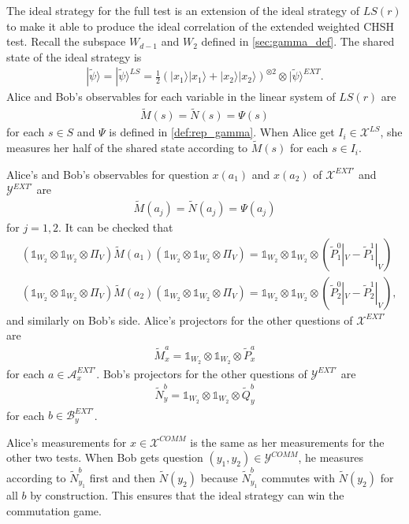 \documentclass[11pt,letterpaper]{article}
\newcommand{\ket}[1]{|#1\rangle}
\newcommand{\x}{\otimes}
\newcommand{\calX}{\mathcal{X}}
\newcommand{\calY}{\mathcal{Y}}
\newcommand{\calA}{\mathcal{A}}
\newcommand{\calB}{\mathcal{B}}
\newcommand{\1}{\mathbb{1}}
\newcommand{\EXT}{EXT}
\newcommand{\LS}{LS}
\newcommand{\COMM}{COMM}
\newcommand{\tP}{\tilde{P}}
\newcommand{\tQ}{\tilde{Q}}
\newcommand{\tM}{\tilde{M}}
\newcommand{\tN}{\tilde{N}}
\newcommand{\tpsi}{\tilde{\psi}}
\theoremstyle{definition}
\begin{document}
The ideal strategy for the full test is an extension of the ideal strategy of $\LS(r)$ to make it able to produce the ideal correlation of 
the extended weighted CHSH test.
Recall the subspace $W_{d-1}$ and $W_2$ defined in \cref{sec:gamma_def}.
The shared state of the ideal strategy is
\begin{align*}
    \ket{\tpsi} = \ket{\tpsi}^{\LS} = \frac{1}{2}(\ket{x_1}\ket{x_1} + 
    \ket{x_2}\ket{x_2})^{\x 2} \x \ket{\tpsi}^{\EXT}.
\end{align*}
Alice and Bob's observables for each variable in the linear system of 
$\LS(r)$ are 
\begin{align*}
    \tM(s) = \tN(s) = \Psi(s) 
\end{align*}
for each $s \in S$ and $\Psi$ is defined in \cref{def:rep_gamma}.
When Alice get $I_i \in \calX^{\LS}$, she measures her half of the shared
state according to $\tM(s)$ for each $s \in I_i$.

Alice's and Bob's observables for question $x(a_1)$ and $x(a_2)$ of $\calX^{\EXT'}$ and $\calY^{\EXT'}$ are
\begin{align*}
    \tM(a_j) = \tN(a_j) = \Psi(a_j) 
\end{align*}
for $j= 1,2$.
It can be checked that 
\begin{align*}
    &(\1_{W_2} \x \1_{W_2} \x \Pi_V) \tM(a_1) (\1_{W_2} \x \1_{W_2} \x \Pi_V) = \1_{W_2} \x \1_{W_2} \x (\tP_1^0|_V - \tP_1^1|_V) \\
    &(\1_{W_2} \x \1_{W_2} \x \Pi_V) \tM(a_2) (\1_{W_2} \x \1_{W_2} \x \Pi_V) = \1_{W_2} \x \1_{W_2} \x (\tP_2^0|_V - \tP_2^1|_V),
\end{align*}
and similarly on Bob's side.
Alice's projectors for the other questions of $\calX^{\EXT'}$ are
\begin{align*}
    \tM_x^a = \1_{W_2} \x \1_{W_2} \x \tP_x^a
\end{align*}
for each $a \in \calA^{\EXT'}_x$.
Bob's projectors for the other questions of $\calY^{\EXT'}$ are 
\begin{align*}
    \tN_y^b = \1_{W_2} \x \1_{W_2} \x \tQ_y^b
\end{align*}
for each $b \in \calB^{\EXT'}_y$.

Alice's measurements for $x \in \calX^{\COMM}$ is the same as her
measurements for the other two tests.
When Bob gets question $(y_1, y_2) \in \calY^{\COMM}$, he measures 
according to $\tN_{y_1}^b$ first and then $\tN(y_2)$ because $\tN_{y_1}^b$
commutes with $\tN(y_2)$ for all $b$ by construction.
This ensures that the ideal strategy can win the commutation game.
\end{document}
